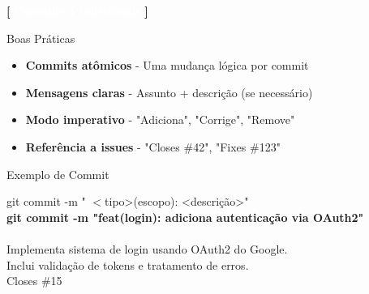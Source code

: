 \documentclass[10pt, brazil]{beamer}
\begin{document}
\begin{frame}{\textcolor{lightpurple}{\textbf{[}} \textbf{\textcolor{white}{Commits Profissionais}} \textcolor{lightpurple}{\textbf{]}}}
  
  \begin{block}{Boas Práticas}
    \begin{itemize}
      \item \textbf{Commits atômicos} - Uma mudança lógica por commit
      \item \textbf{Mensagens claras} - Assunto + descrição (se necessário)
      \item \textbf{Modo imperativo} - "Adiciona", "Corrige", "Remove"
      \item \textbf{Referência a issues} - "Closes \#42", "Fixes \#123"
    \end{itemize}
  \end{block}

  \vspace{1em}

  \begin{block}{Exemplo de Commit}
    \begin{scriptsize}
      git commit -m " $<$tipo>(escopo): <descrição>"\\
      \textbf{git commit -m "feat(login): adiciona autenticação via OAuth2"}\\
      \ \\
      Implementa sistema de login usando OAuth2 do Google.\\
      Inclui validação de tokens e tratamento de erros.\\
      Closes \#15
    \end{scriptsize}
  \end{block}

\end{frame}
\end{document}

